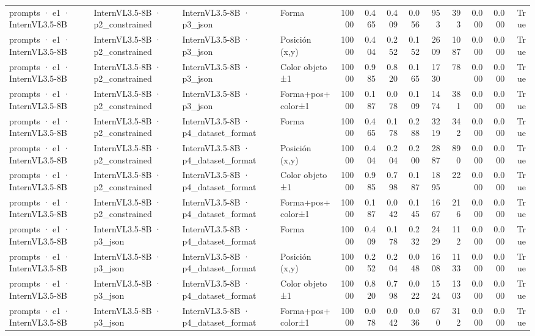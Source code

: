 \begin{tabular}{llllrrrrrrrrr}
prompts · e1 · InternVL3.5-8B & InternVL3.5-8B · p2\_constrained & InternVL3.5-8B · p3\_json & Forma & 10000 & 0.465 & 0.409 & 0.056 & 953 & 393 & 0.000 & 0.000 & True \\
prompts · e1 · InternVL3.5-8B & InternVL3.5-8B · p2\_constrained & InternVL3.5-8B · p3\_json & Posición (x,y) & 10000 & 0.404 & 0.252 & 0.152 & 2609 & 1087 & 0.000 & 0.000 & True \\
prompts · e1 · InternVL3.5-8B & InternVL3.5-8B · p2\_constrained & InternVL3.5-8B · p3\_json & Color objeto ±1 & 10000 & 0.985 & 0.820 & 0.165 & 1730 & 78 & 0.000 & 0.000 & True \\
prompts · e1 · InternVL3.5-8B & InternVL3.5-8B · p2\_constrained & InternVL3.5-8B · p3\_json & Forma+pos+color±1 & 10000 & 0.187 & 0.078 & 0.109 & 1474 & 381 & 0.000 & 0.000 & True \\
prompts · e1 · InternVL3.5-8B & InternVL3.5-8B · p2\_constrained & InternVL3.5-8B · p4\_dataset\_format & Forma & 10000 & 0.465 & 0.178 & 0.288 & 3219 & 342 & 0.000 & 0.000 & True \\
prompts · e1 · InternVL3.5-8B & InternVL3.5-8B · p2\_constrained & InternVL3.5-8B · p4\_dataset\_format & Posición (x,y) & 10000 & 0.404 & 0.204 & 0.200 & 2887 & 890 & 0.000 & 0.000 & True \\
prompts · e1 · InternVL3.5-8B & InternVL3.5-8B · p2\_constrained & InternVL3.5-8B · p4\_dataset\_format & Color objeto ±1 & 10000 & 0.985 & 0.798 & 0.187 & 1895 & 22 & 0.000 & 0.000 & True \\
prompts · e1 · InternVL3.5-8B & InternVL3.5-8B · p2\_constrained & InternVL3.5-8B · p4\_dataset\_format & Forma+pos+color±1 & 10000 & 0.187 & 0.042 & 0.145 & 1667 & 216 & 0.000 & 0.000 & True \\
prompts · e1 · InternVL3.5-8B & InternVL3.5-8B · p3\_json & InternVL3.5-8B · p4\_dataset\_format & Forma & 10000 & 0.409 & 0.178 & 0.232 & 2429 & 112 & 0.000 & 0.000 & True \\
prompts · e1 · InternVL3.5-8B & InternVL3.5-8B · p3\_json & InternVL3.5-8B · p4\_dataset\_format & Posición (x,y) & 10000 & 0.252 & 0.204 & 0.048 & 1608 & 1133 & 0.000 & 0.000 & True \\
prompts · e1 · InternVL3.5-8B & InternVL3.5-8B · p3\_json & InternVL3.5-8B · p4\_dataset\_format & Color objeto ±1 & 10000 & 0.820 & 0.798 & 0.022 & 1524 & 1303 & 0.000 & 0.000 & True \\
prompts · e1 · InternVL3.5-8B & InternVL3.5-8B · p3\_json & InternVL3.5-8B · p4\_dataset\_format & Forma+pos+color±1 & 10000 & 0.078 & 0.042 & 0.036 & 670 & 312 & 0.000 & 0.000 & True \\

\end{tabular}
